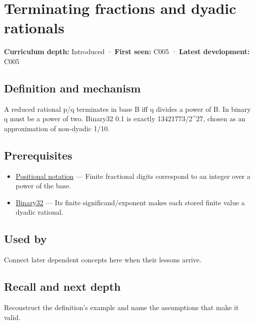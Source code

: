 \hypertarget{appendix-2a2f1b74bdd3}{}\label{referencestart:appendix-2a2f1b74bdd3}
\section{Terminating fractions and dyadic rationals}\label{appendix-2a2f1b74bdd3-terminating-fractions-and-dyadic-rationals}

\textbf{Curriculum depth:} Introduced · \textbf{First seen:} C005 · \textbf{Latest development:} C005

\subsection{Definition and mechanism}\label{appendix-2a2f1b74bdd3-definition-and-mechanism}

A reduced rational p/q terminates in base B iff q divides a power of B. In binary q must be a power of two. Binary32 0.1 is exactly 13421773/2\^{}27, chosen as an approximation of non-dyadic 1/10.

\subsection{Prerequisites}\label{appendix-2a2f1b74bdd3-prerequisites}

\begin{itemize}
\tightlist
\item
  \hyperref[appendix-83c3f28f7bda]{Positional notation} --- Finite fractional digits correspond to an integer over a power of the base.
\item
  \hyperref[appendix-5057f9ad327f]{Binary32} --- Its finite significand/exponent makes each stored finite value a dyadic rational.
\end{itemize}

\subsection{Used by}\label{appendix-2a2f1b74bdd3-used-by}

Connect later dependent concepts here when their lessons arrive.

\subsection{Recall and next depth}\label{appendix-2a2f1b74bdd3-recall-and-next-depth}

Reconstruct the definition's example and name the assumptions that make it valid.

